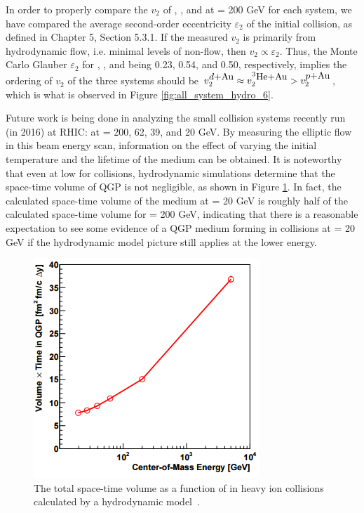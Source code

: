 In order to properly compare the $v_2$ of \pau, \dau, and \hau at \sqsn = 200 GeV for each system, we have compared the average second-order eccentricity $\varepsilon_2$ of the initial collision, as defined in Chapter 5, Section 5.3.1. If the measured $v_2$ is primarily from hydrodynamic flow, i.e. minimal levels of non-flow, then $v_2 \propto \varepsilon_2$. Thus, the Monte Carlo Glauber $\varepsilon_2$ for \pau, \dau, and \hau being 0.23, 0.54, and 0.50, respectively, implies the ordering of $v_2$ of the three systems should be $v_2^{\mbox{$d$+Au}} \approx v_2^{\mbox{$^3\text{He}$+Au}} > v_2^{\mbox{$p$+Au}}$, which is what is observed in Figure \ref{fig:all_system_hydro_6}.

Future work is being done in analyzing the small collision systems recently run (in 2016) at RHIC: \dau at \sqsn = 200, 62, 39, and 20 GeV. By measuring the elliptic flow in this \dau beam energy scan, information on the effect of varying the initial temperature and the lifetime of the medium can be obtained. It is noteworthy that even at low \sqsn for \dau collisions, hydrodynamic simulations determine that the space-time volume of QGP is not negligible, as shown in Figure \ref{fig:size_or_mediumcalc}. In fact, the calculated space-time volume of the medium at \sqsn = 20 GeV is roughly half of the calculated space-time volume for \sqsn = 200 GeV, indicating that there is a reasonable expectation to see some evidence of a QGP medium forming in \dau collisions at \sqsn = 20 GeV if the hydrodynamic model picture still applies at the lower energy.

\begin{figure}[!ht]
\begin{center}
\includegraphics[width=0.5\linewidth]{figs/size_of_medium_calculation.png}
\caption{The total space-time volume as a function of \sqsn in heavy ion collisions calculated by a hydrodynamic model~\cite{PhysRevC.93.044910}.}
\label{fig:size_or_mediumcalc}
\end{center}
\end{figure}

